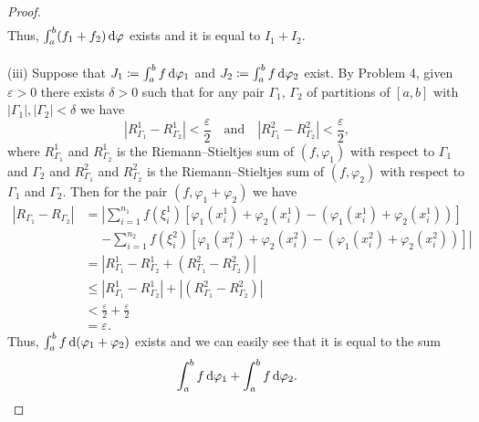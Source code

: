 \begin{proof}
\begin{align*}
  \end{align*}
  Thus, $\int_a^b (f_1+f_2)\mathop{}\!\mathrm{d}\varphi$ exists and it is equal to
  $I_1+I_2$.
  \\\\
  (iii) Suppose that $J_1\coloneq\int_a^bf\mathop{}\!\mathrm{d}\varphi_1$ and
  $J_2\coloneq\int_a^bf\mathop{}\!\mathrm{d}\varphi_2$ exist. By Problem 4, given
  $\varepsilon>0$ there exists $\delta>0$ such that for any pair $\Gamma_1$,
  $\Gamma_2$ of partitions of $[a,b]$ with $|\Gamma_1|,|\Gamma_2|<\delta$
  we have
  \[
    |R_{\Gamma_1}^1-R_{\Gamma_2}^1|<\frac{\varepsilon}{2}\quad\text{and}\quad
    |R_{\Gamma_1}^2-R_{\Gamma_2}^2|<\frac{\varepsilon}{2},
  \]
  where $R_{\Gamma_1}^1$ and $R_{\Gamma_2}^1$ is the Riemann--Stieltjes sum
  of $(f,\varphi_1)$ with respect to $\Gamma_1$ and $\Gamma_2$ and
  $R_{\Gamma_1}^2$ and $R_{\Gamma_2}^2$ is the Riemann--Stieltjes sum of
  $(f,\varphi_2)$ with respect to $\Gamma_1$ and $\Gamma_2$. Then for the
  pair $(f,\varphi_1+\varphi_2)$ we have
  \begin{align*}
    |R_{\Gamma_1}-R_{\Gamma_2}|
    &=%
      \left|%
      \sum_{i=1}^{n_1}f(\xi_i^1)\left[\varphi_1(x_i^1)+\varphi_2(x_i^1)
      -(\varphi_1(x_i^1)+\varphi_2(x_i^1))\right]\right.\\
    &\phantom{{}={}}%
      \left.%
      -\sum_{i=1}^{n_2}f(\xi_i^2)\left[\varphi_1(x_i^2)+\varphi_2(x_i^2)
      -(\varphi_1(x_i^2)+\varphi_2(x_i^2))\right]
      \right|\\
    &=\left|%
      R_{\Gamma_1}^1-R_{\Gamma_2}^1+(R_{\Gamma_1}^2-R_{\Gamma_2}^2)
      \right|\\
    &\leq|%
      R_{\Gamma_1}^1-R_{\Gamma_2}^1
      |+
      |%
      (R_{\Gamma_1}^2-R_{\Gamma_2}^2)
      |\\
    &<\frac{\varepsilon}{2}+\frac{\varepsilon}{2}\\
    &=\varepsilon.
  \end{align*}
  Thus, $\int_a^bf\mathop{}\!\mathrm{d}(\varphi_1+\varphi_2)$ exists and we can easily see
  that it is equal to the sum
  \[
    \int_a^bf\mathop{}\!\mathrm{d}\varphi_1
    +\int_a^bf\mathop{}\!\mathrm{d}\varphi_2.
  \]
\end{proof}

